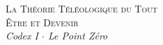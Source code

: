 \documentclass[10pt, openany, oneside]{book}
\renewcommand{\normalsize}{\fontsize{10}{13}\selectfont}
\begin{document}

\thispagestyle{empty}
\vspace*{\fill}
\begin{center}
    {\normalsize\scshape La Théorie Téléologique du Tout}\\[1.5em]
    {\fontsize{24}{28}\selectfont\scshape Être et Devenir}\\[0.8em]
    {\normalsize\itshape Codex I $\cdot$ Le Point Zéro}
\end{center}
\vspace*{\fill}
\newpage

\end{document}
